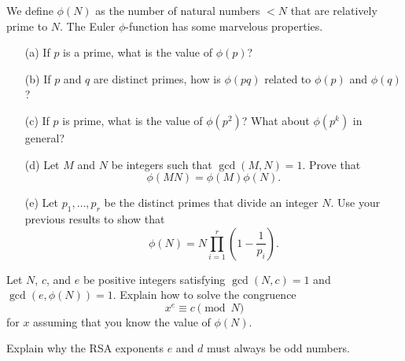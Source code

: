 \documentclass{article}
\begin{document}
    \begin{exercise}
        We define \(\phi(N)\) as the number of natural numbers \(<N\) that are relatively prime to \(N\).
        The Euler \(\phi\)-function has some marvelous properties.
        \begin{enumerate}
            \item[(a)] If \(p\) is a prime, what is the value of \(\phi(p)\)?
            \item[(b)] If \(p\) and \(q\) are distinct primes, how is \(\phi(pq)\) related to \(\phi(p)\) and \(\phi(q)\)?
            \item[(c)] If \(p\) is prime, what is the value of \(\phi(p^2)\)?
            What about \(\phi(p^k)\) in general?
            \item[(d)] Let \(M\) and \(N\) be integers such that \(\gcd(M,N)=1\).
            Prove that
            \[\phi(MN) = \phi(M)\phi(N).\]
            \item[(e)] Let \(p_1,\ldots,p_r\) be the distinct primes that divide an integer \(N\). 
            Use your previous results to show that 
            \[\phi(N) = N\prod_{i=1}^r\left(1-\frac{1}{p_i}\right).\]
        \end{enumerate}
    \end{exercise}
    \iffalse
    Solution:
    Most of these computations are straightforward.
    \fi

    \begin{exercise}
        Let \(N\), \(c\), and \(e\) be positive integers satisfying \(\gcd(N,c)=1\) and \(\gcd(e,\phi(N))=1\).
        Explain how to solve the congruence
        \[x^e \equiv c\pmod{N}\]
        for \(x\) assuming that you know the value of \(\phi(N)\).
    \end{exercise}
    \iffalse
    Solution:
    By Bezout's lemma there exists \(a,b\) such that \(ae+b\phi(N)=1\).
    Now,
    \[x=x^{ae+b\phi(N)}\equiv \left(x^e\right)^a\left(x^{\phi(N)}\right)^b\equiv c^a\pmod{N}\]
    by Euler's theorem.
    \fi

    \begin{exercise}
        Explain why the RSA exponents \(e\) and \(d\) must always be odd numbers.
    \end{exercise}
    \iffalse
    Solution:
    By definition, \(\gcd(e,(p-1)(q-1))=1\).
    Since \((p-1)(q-1)\) is even, \(e\) must be odd.
    Also, the equation
    \[1 = ed + k(p-1)(q-1)\]
    holds for some \(k\in\ZZ\).
    Since \((p-1)(q-1)\) is even and \(e\) is odd, \(d\) cannot be even (otherwise the sum on the right would be even).
    \fi
\end{document}
